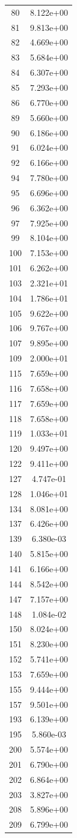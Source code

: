 \documentclass[12pt]{article}
\begin{document}
\begin{longtable}{@{}cc@{}}
80 & 8.122e+00 \\
81 & 9.813e+00 \\
82 & 4.669e+00 \\
83 & 5.684e+00 \\
84 & 6.307e+00 \\
85 & 7.293e+00 \\
86 & 6.770e+00 \\
89 & 5.660e+00 \\
90 & 6.186e+00 \\
91 & 6.024e+00 \\
92 & 6.166e+00 \\
94 & 7.780e+00 \\
95 & 6.696e+00 \\
96 & 6.362e+00 \\
97 & 7.925e+00 \\
99 & 8.104e+00 \\
100 & 7.153e+00 \\
101 & 6.262e+00 \\
103 & 2.321e+01 \\
104 & 1.786e+01 \\
105 & 9.622e+00 \\
106 & 9.767e+00 \\
107 & 9.895e+00 \\
109 & 2.000e+01 \\
115 & 7.659e+00 \\
116 & 7.658e+00 \\
117 & 7.659e+00 \\
118 & 7.658e+00 \\
119 & 1.033e+01 \\
120 & 9.497e+00 \\
122 & 9.411e+00 \\
127 & 4.747e-01 \\
128 & 1.046e+01 \\
134 & 8.081e+00 \\
137 & 6.426e+00 \\
139 & 6.380e-03 \\
140 & 5.815e+00 \\
141 & 6.166e+00 \\
144 & 8.542e+00 \\
147 & 7.157e+00 \\
148 & 1.084e-02 \\
150 & 8.024e+00 \\
151 & 8.230e+00 \\
152 & 5.741e+00 \\
153 & 7.659e+00 \\
155 & 9.444e+00 \\
157 & 9.501e+00 \\
193 & 6.139e+00 \\
195 & 5.860e-03 \\
200 & 5.574e+00 \\
201 & 6.790e+00 \\
202 & 6.864e+00 \\
203 & 3.827e+00 \\
208 & 5.896e+00 \\
209 & 6.799e+00 \\

\bottomrule
\end{longtable}
\end{document}

